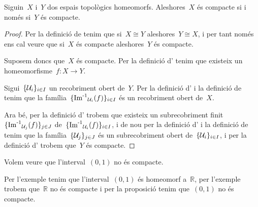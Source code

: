 \documentclass[../../main.tex]{subfiles}
\begin{document}
    \begin{proposition}
        \label{prop:la compacitat és una propietat topològica}
        Siguin~\(X\) i~\(Y\) dos espais topològics homeomorfs.
        Aleshores~\(X\) és compacte si i només si~\(Y\) és compacte.
        \begin{proof}
            Per la definició de  tenim que si~\(X\cong Y\) aleshores~\(Y\cong X\), i per tant només ens cal veure que si~\(X\) és compacte aleshores~\(Y\) és compacte.

            Suposem doncs que~\(X\) és compacte.
            Per la definició d' tenim que existeix un homeomorfisme~\(f\colon X\longrightarrow Y\).

            Sigui~\(\{\mathcal{U}_{i}\}_{i\in I}\) un recobriment obert de~\(Y\).
            Per la definició d' i la definició de  tenim que la família~\(\{\operatorname{\operatorname{Im}^{-1}}_{\mathcal{U}_{i}}(f)\}_{i\in I}\) és un recobriment obert de~\(X\).

            Ara bé, per la definició d' trobem que existeix un subrecobriment finit~\(\{\operatorname{\operatorname{Im}^{-1}}_{\mathcal{U}_{j}}(f)\}_{j\in J}\) de~\(\{\operatorname{\operatorname{Im}^{-1}}_{\mathcal{U}_{i}}(f)\}_{i\in I}\), i de nou per la definició d' i la definició de  tenim que la família~\(\{\mathcal{U}_{j}\}_{j\in J}\) és un subrecobriment obert de~\(\{\mathcal{U}_{i}\}_{i\in I}\), i per la definició d' trobem que~\(Y\) és compacte.
        \end{proof}
    \end{proposition}
    \begin{example}
        \label{ex:l'interval (0,1) no és compacte}
        Volem veure que l'interval~\((0,1)\) no és compacte.
        \begin{solution}
            Per l'exemple  tenim que l'interval~\((0,1)\) és homeomorf a~\(\mathbb{R}\), per l'exemple  trobem que~\(\mathbb{R}\) no és compacte i per la proposició  tenim que~\((0,1)\) no és compacte.
        \end{solution}
    \end{example}
\end{document}
